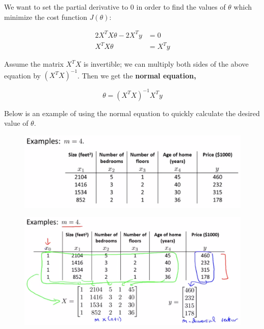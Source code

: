 \documentclass{article}
\begin{document}
        \noindent We want to set the partial derivative to 0 in order to find the values of $\theta$ which
        minimize the cost function $J(\theta)$:

        \begin{align*}
            2X^T X\theta - 2X^T y &= 0 \\
            X^T X\theta &= X^T y
        \end{align*}

        \noindent Assume the matrix $X^T X$ is invertible; we can multiply both sides of the above equation
        by $(X^T X)^{-1}$. Then we get the \textbf{normal equation,}

        \begin{equation*}
            \theta = (X^T X)^{-1} X^T y
        \end{equation*}

        \noindent Below is an example of using the normal equation to quickly calculate the desired value of
        $\theta$.

        \begin{figure}[hbt!]
            \centering
            \includegraphics[scale=0.5]{Resources/Norm_Equation_Example}
        \end{figure}

        \pagebreak

        \begin{figure}[hbt!]
            \centering
            \includegraphics[scale=0.4]{Resources/Norm_Equation_Example2}
        \end{figure}
\end{document}
